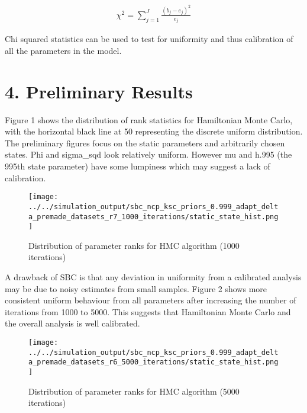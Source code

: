 \documentclass[
  12pt,
  letterpaper,
  DIV=11,
  numbers=noendperiod]{scrartcl}
\begin{document}
\[
\begin{aligned}
\chi^2 = \sum_{j=1}^J \frac{(b_{j} - e_{j})^2}{e_j}
\end{aligned}
\]

Chi squared statistics can be used to test for uniformity and thus
calibration of all the parameters in the model.

\hypertarget{preliminary-results}{%
\section{4. Preliminary Results}\label{preliminary-results}}

Figure 1 shows the distribution of rank statistics for Hamiltonian Monte
Carlo, with the horizontal black line at 50 representing the discrete
uniform distribution. The preliminary figures focus on the static
parameters and arbitrarily chosen states. Phi and sigma\_sqd look
relatively uniform. However mu and h.995 (the 995th state parameter)
have some lumpiness which may suggest a lack of calibration.

\begin{figure}[H]

{\centering \texttt{[image: ../../simulation\_output/sbc\_ncp\_ksc\_priors\_0.999\_adapt\_delta\_premade\_datasets\_r7\_1000\_iterations/static\_state\_hist.png]}

}

\caption{Distribution of parameter ranks for HMC algorithm (1000
iterations)}

\end{figure}

A drawback of SBC is that any deviation in uniformity from a calibrated
analysis may be due to noisy estimates from small samples. Figure 2
shows more consistent uniform behaviour from all parameters after
increasing the number of iterations from 1000 to 5000. This suggests
that Hamiltonian Monte Carlo and the overall analysis is well
calibrated.

\begin{figure}[H]

{\centering \texttt{[image: ../../simulation\_output/sbc\_ncp\_ksc\_priors\_0.999\_adapt\_delta\_premade\_datasets\_r6\_5000\_iterations/static\_state\_hist.png]}

}

\caption{Distribution of parameter ranks for HMC algorithm (5000
iterations)}

\end{figure}
\end{document}

